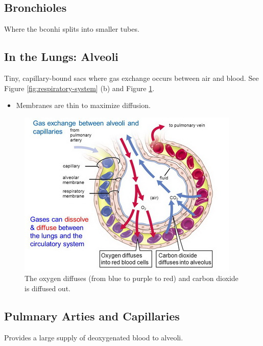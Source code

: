 \documentclass[12pt]{report}
\begin{document}
\subsection{Bronchioles}
\begin{definition}[Bronchioles]
    Where the bconhi splits into smaller tubes.
\end{definition}

\divider 

\subsection{In the Lungs: Alveoli}
\begin{definition}
    Tiny, capillary-bound sacs where gas exchange occurs between air and blood. See Figure \ref{fig:respiratory-system} (b) and Figure \ref{fig:alveoli}.
    \begin{itemize}
        \item{Membranes are thin to maximize diffusion.}
    \end{itemize}
\end{definition}

\begin{figure}[H]
\centering
    \includegraphics[width=0.7 \textwidth]{../figures/alveoli2.jpg}
    \caption{The oxygen diffuses (from blue to purple to red) and carbon dioxide is diffused out.}
    \label{fig:alveoli}
\end{figure}

\subsection{Pulmnary Arties and Capillaries}
\begin{definition}
    Provides a large supply of deoxygenated blood to alveoli.
\end{definition}
\end{document}
